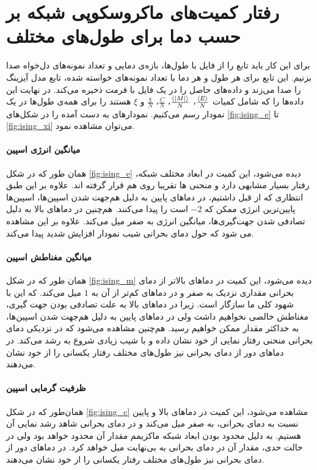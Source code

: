 \documentclass[11pt, a4paper]{article}
\begin{document}
\section{\textbf{رفتار کمیت‌های ماکروسکوپی شبکه بر حسب دما برای طول‌های مختلف}}
برای این کار باید تابع
را از فایل
با طول‌ها، بازه‌ی دمایی و تعداد نمونه‌های دل‌خواه صدا بزنیم.
این تابع برای هر طول و هر دما با تعداد نمونه‌های خواسته شده،
تابع
مدل آیزینگ را صدا می‌زند و داده‌های حاصل را در یک فایل با فرمت
ذخیره می‌کند.
در نهایت این داده‌ها را که شامل کمیات
$\frac{\braket{E}}{N}$،
$\frac{\braket{|M|}}{N}$،
$\frac{C}{N}$،
$\frac{\chi}{N}$
و
$\xi$
هستند را برای همه‌ی طول‌ها در یک نمودار رسم می‌کنیم.
نمودار‌های به دست آمده را در شکل‌های
\ref{fig:ising_e}
تا
\ref{fig:ising_xi}
می‌توان مشاهده نمود.

\paragraph{میانگین انرژی اسپین}
همان طور که در شکل
\ref{fig:ising_e}
دیده می‌شود،
این کمیت در ابعاد مختلف شبکه،
رفتار بسیار مشابهی دارد و منحنی ‌ها تقریبا روی هم قرار گرفته اند.
علاوه بر این طبق انتظاری که از قبل داشتیم،
در دماهای پایین به دلیل هم‌جهت شدن اسپین‌ها،
اسپین‌ها پایین‌ترین انرژی ممکن که
$-2$
است را پیدا می‌کنند.
هم‌چنین در دما‌های بالا به دلیل تصادفی شدن جهت‌گیری‌ها،
میانگین انرژی به صفر میل می‌کند.
علاوه بر این مشاهده می شود که حول دمای بحرانی شیب نمودار افزایش شدید پیدا می‌کند.

\paragraph{میانگین مغناطش اسپین}
همان طور که در شکل
\ref{fig:ising_m}
دیده می‌شود،
این کمیت در دماهای بالاتر از دمای بحرانی مقداری نزدیک به صفر و در دما‌های کم‌تر از آن به
$1$
میل می‌کند.
که این با شهود کلی ما سازگار است.
زیرا در دما‌های بالا به علت تصادفی بودن جهت گیری، مغناطش خالصی نخواهیم داشت ولی
در دما‌های پایین به دلیل هم‌جهت شدن اسپین‌ها،
به حداکثر مقدار ممکن خواهیم رسید.
هم‌چنین مشاهده می‌شود که در نزدیکی دمای بحرانی منحنی رفتار نمایی از خود نشان داده و با شیب زیادی شروع به رشد می‌کند.
در دماهای دور از دمای بحرانی نیز طول‌های مختلف رفتار یکسانی را از خود نشان می‌دهند.

\paragraph{ظرفیت گرمایی اسپین}
همان‌طور که در شکل
\ref{fig:ising_c}
مشاهده می‌شود،
این کمیت در دماهای بالا و پایین نسبت به دمای بحرانی، به صفر میل می‌کند
و در دمای بحرانی شاهد رشد نمایی آن هستیم.
به دلیل محدود بودن ابعاد شبکه ماکزیمم مقدار آن محدود خواهد بود ولی در حالت حدی،
مقدار آن در دمای بحرانی به بی‌نهایت میل خواهد کرد.
در دماهای دور از دمای بحرانی نیز طول‌های مختلف رفتار یکسانی را از خود نشان می‌دهند.
\end{document}
